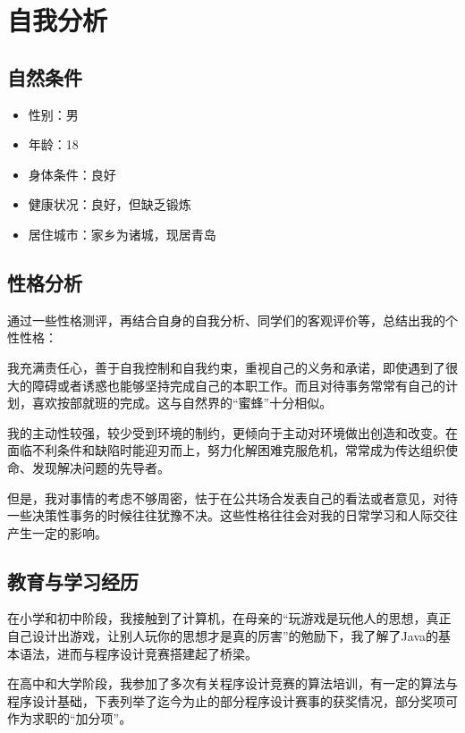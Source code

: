 \documentclass{article}
\begin{document}
\thispagestyle{empty}
\newpage

\setcounter{page}{1}

\section{自我分析}

\subsection{自然条件}

\begin{itemize}
    \item 性别：男
    \item 年龄：18
    \item 身体条件：良好
    \item 健康状况：良好，但缺乏锻炼
    \item 居住城市：家乡为诸城，现居青岛
\end{itemize}

\subsection{性格分析}

通过一些性格测评，再结合自身的自我分析、同学们的客观评价等，总结出我的个性性格：

我充满责任心，善于自我控制和自我约束，重视自己的义务和承诺，即使遇到了很大的障碍或者诱惑也能够坚持完成自己的本职工作。而且对待事务常常有自己的计划，喜欢按部就班的完成。这与自然界的“蜜蜂”十分相似。

我的主动性较强，较少受到环境的制约，更倾向于主动对环境做出创造和改变。在面临不利条件和缺陷时能迎刃而上，努力化解困难克服危机，常常成为传达组织使命、发现解决问题的先导者。

但是，我对事情的考虑不够周密，怯于在公共场合发表自己的看法或者意见，对待一些决策性事务的时候往往犹豫不决。这些性格往往会对我的日常学习和人际交往产生一定的影响。

\subsection{教育与学习经历}

在小学和初中阶段，我接触到了计算机，在母亲的“玩游戏是玩他人的思想，真正自己设计出游戏，让别人玩你的思想才是真的厉害”的勉励下，我了解了Java的基本语法，进而与程序设计竞赛搭建起了桥梁。

在高中和大学阶段，我参加了多次有关程序设计竞赛的算法培训，有一定的算法与程序设计基础，下表列举了迄今为止的部分程序设计赛事的获奖情况，部分奖项可作为求职的“加分项”。
\end{document}
